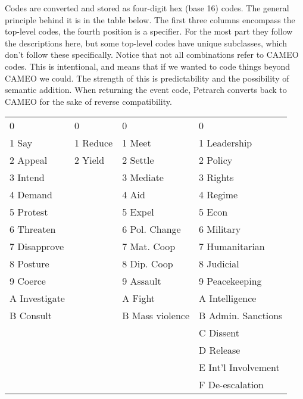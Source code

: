 \documentclass[11pt]{article}
\begin{document}
Codes are converted and stored as four-digit hex (base 16) codes.
The general principle behind it is in the table below. The 
first three columns encompass the top-level codes, the fourth position is a specifier. For the 
most part they follow the descriptions here, but some top-level codes have unique subclasses,
which don't follow these specifically. Notice that not all 
combinations refer to CAMEO codes. This is intentional, and means that if we 
wanted to code things beyond CAMEO we could. The strength of this is 
predictability and the possibility of semantic addition. When returning the 
event code, Petrarch converts back to CAMEO for the sake of 
reverse compatibility.

\vspace{12mm}
\begin{tabular}{llll}
             0        &        0   &       0               &        0 \\
            1 Say  &      1 Reduce &   1 Meet   &               1 Leadership \\
            2 Appeal     &    2 Yield  &  2 Settle      &          2 Policy\\
            3 Intend     &~   &            3 Mediate    &           3 Rights\\
            4 Demand      &~     &        4 Aid               &    4 Regime\\
            5 Protest	  &~    &          5 Expel         &        5 Econ\\
            6 Threaten              &~     &    6 Pol. Change    &       6 Military\\
            7 Disapprove    &~    &        7 Mat. Coop  &           7 Humanitarian\\
            8 Posture       &~        &    8 Dip. Coop     &        8 Judicial\\
            9 Coerce          &~      &    9 Assault	        &    9 Peacekeeping\\
            A Investigate &~         &     A Fight		  &  	A Intelligence\\
            B Consult  	&~	&   B Mass violence	&	B Admin. Sanctions\\
           ~ 	&~	&				  ~  			       &     C Dissent\\
           ~ 	&~	&				 ~   				  &      D Release\\
            ~	&~&					~	     		       &     E Int'l Involvement\\
           ~ &~&						  ~ 		            & F De-escalation\\

  
\end{tabular}
\end{document}

